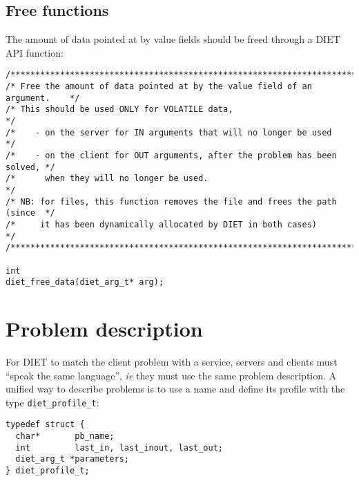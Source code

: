 \subsection{Free functions}
\label{sec:freefun}

The amount of data  pointed at by value fields should be freed through a DIET
API function:
{\footnotesize
\begin{verbatim}
/****************************************************************************/
/* Free the amount of data pointed at by the value field of an argument.    */
/* This should be used ONLY for VOLATILE data,                              */
/*    - on the server for IN arguments that will no longer be used          */
/*    - on the client for OUT arguments, after the problem has been solved, */
/*      when they will no longer be used.                                   */
/* NB: for files, this function removes the file and frees the path (since  */
/*     it has been dynamically allocated by DIET in both cases)             */
/****************************************************************************/

int
diet_free_data(diet_arg_t* arg);
\end{verbatim}
}


\section{Problem description}
\label{sec:pbdesc}

For DIET to match the client problem with a service, servers and clients must
``speak the same language'', \emph{ie} they must use the same problem
description. A unified way to describe problems is to use a name and define its
profile with the type \texttt{diet\_profile\_t}:
{\footnotesize
\begin{verbatim}
typedef struct {
  char*       pb_name;
  int         last_in, last_inout, last_out;
  diet_arg_t *parameters;
} diet_profile_t;
\end{verbatim}
}



